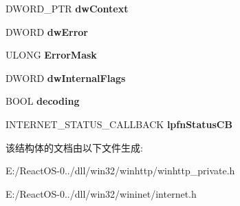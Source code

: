 \begin{DoxyCompactItemize}
D\+W\+O\+R\+D\+\_\+\+P\+TR {\bfseries dw\+Context}
\item 
\mbox{\label{struct__object__header__t_a00bb05df0d3104c0e9f8068891d05203}} 
D\+W\+O\+RD {\bfseries dw\+Error}
\item 
\mbox{\label{struct__object__header__t_a91b689ae902b98fd5c55f61bec1e8464}} 
U\+L\+O\+NG {\bfseries Error\+Mask}
\item 
\mbox{\label{struct__object__header__t_a2b550d3beda112d46d87e69c746cbd60}} 
D\+W\+O\+RD {\bfseries dw\+Internal\+Flags}
\item 
\mbox{\label{struct__object__header__t_ae8ef51c50ad6132fa4cf75b545089a71}} 
B\+O\+OL {\bfseries decoding}
\item 
\mbox{\label{struct__object__header__t_abedccc6517eba98fee49cb1435d374a8}} 
I\+N\+T\+E\+R\+N\+E\+T\+\_\+\+S\+T\+A\+T\+U\+S\+\_\+\+C\+A\+L\+L\+B\+A\+CK {\bfseries lpfn\+Status\+CB}
\end{DoxyCompactItemize}


该结构体的文档由以下文件生成\+:\begin{DoxyCompactItemize}
\item 
E\+:/\+React\+O\+S-\/0../dll/win32/winhttp/winhttp\+\_\+private.\+h\item 
E\+:/\+React\+O\+S-\/0../dll/win32/wininet/internet.\+h\end{DoxyCompactItemize}
